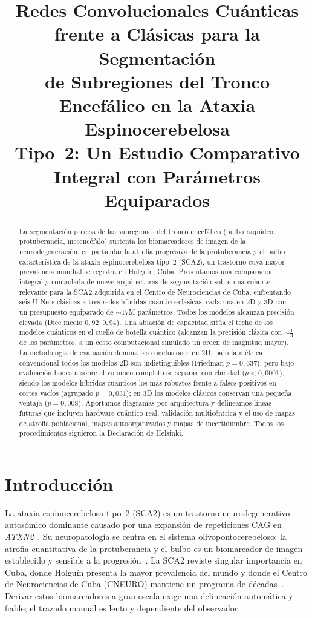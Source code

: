 \documentclass[runningheads]{llncs}
\title{Redes Convolucionales Cuánticas frente a Clásicas para la Segmentación\\
de Subregiones del Tronco Encefálico en la Ataxia Espinocerebelosa\\
Tipo~2: Un Estudio Comparativo Integral con Parámetros Equiparados}
\author{\todo{Autor Uno}\inst{1} \and \todo{Autor Dos}\inst{1} \and \todo{Autor Senior}\inst{1}}
\institute{Centro de Neurociencias de Cuba (CNEURO), La Habana, Cuba\\
\email{\todo{correspondencia@email}}}
\begin{document}
\maketitle

\begin{abstract}
La segmentación precisa de las subregiones del tronco encefálico (bulbo
raquídeo, protuberancia, mesencéfalo) sustenta los biomarcadores de imagen de la
neurodegeneración, en particular la atrofia progresiva de la protuberancia y el
bulbo característica de la ataxia espinocerebelosa tipo~2 (SCA2), un trastorno
cuya mayor prevalencia mundial se registra en Holguín, Cuba. Presentamos una
comparación integral y controlada de nueve arquitecturas de segmentación sobre
una cohorte relevante para la SCA2 adquirida en el Centro de Neurociencias de
Cuba, enfrentando seis U-Nets clásicas a tres redes híbridas cuántico--clásicas,
cada una en 2D y 3D con un presupuesto equiparado de ${\sim}17$M parámetros.
Todos los modelos alcanzan precisión elevada (Dice medio $0{,}92$--$0{,}94$). Una
ablación de capacidad sitúa el techo de los modelos cuánticos en el cuello de
botella cuántico (alcanzan la precisión clásica con ${\sim}\tfrac13$ de los
parámetros, a un costo computacional simulado un orden de magnitud mayor). La
metodología de evaluación domina las conclusiones en 2D: bajo la métrica
convencional todos los modelos 2D son indistinguibles (Friedman $p{=}0{,}637$),
pero bajo evaluación honesta sobre el volumen completo se separan con claridad
($p{<}0{,}0001$), siendo los modelos híbridos cuánticos los más robustos frente a
falsos positivos en cortes vacíos (agrupado $p{=}0{,}031$); en 3D los modelos
clásicos conservan una pequeña ventaja ($p{=}0{,}008$). Aportamos diagramas por
arquitectura y delineamos líneas futuras que incluyen hardware cuántico real,
validación multicéntrica y el uso de mapas de atrofia poblacional, mapas
autoorganizados y mapas de incertidumbre. Todos los procedimientos siguieron la
Declaración de Helsinki.
\end{abstract}

\section{Introducción}
La ataxia espinocerebelosa tipo~2 (SCA2) es un trastorno neurodegenerativo
autosómico dominante causado por una expansión de repeticiones CAG en
\emph{ATXN2}~\cite{pulst}. Su neuropatología se centra en el sistema
olivopontocerebeloso; la atrofia cuantitativa de la protuberancia y el bulbo es
un biomarcador de imagen establecido y sensible a la progresión~\cite{velazquez}.
La SCA2 reviste singular importancia en Cuba, donde Holguín presenta la mayor
prevalencia del mundo y donde el Centro de Neurociencias de Cuba (CNEURO)
mantiene un programa de décadas~\cite{velazquez}. Derivar estos biomarcadores a
gran escala exige una delineación automática y fiable; el trazado manual es lento
y dependiente del observador.
\end{document}

